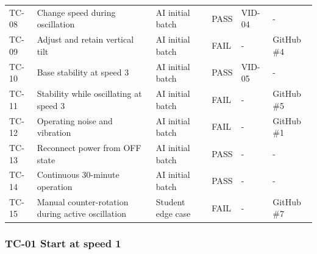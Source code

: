 \begin{longtable}{p{}p{}p{}p{}p{}p{}}
TC-08 & Change speed during oscillation & AI initial batch & PASS & VID-04 & - \\

TC-09 & Adjust and retain vertical tilt & AI initial batch & FAIL & - & GitHub \#4 \\

TC-10 & Base stability at speed 3 & AI initial batch & PASS & VID-05 & - \\

TC-11 & Stability while oscillating at speed 3 & AI initial batch & FAIL & - & GitHub \#5 \\

TC-12 & Operating noise and vibration & AI initial batch & FAIL & - & GitHub \#1 \\

TC-13 & Reconnect power from OFF state & AI initial batch & PASS & - & - \\

TC-14 & Continuous 30-minute operation & AI initial batch & PASS & - & - \\

TC-15 & Manual counter-rotation during active oscillation & Student edge case & FAIL & - & GitHub \#7 \\

\bottomrule\end{longtable}

\clearpage

\subsubsection{TC-01 Start at speed 1}

